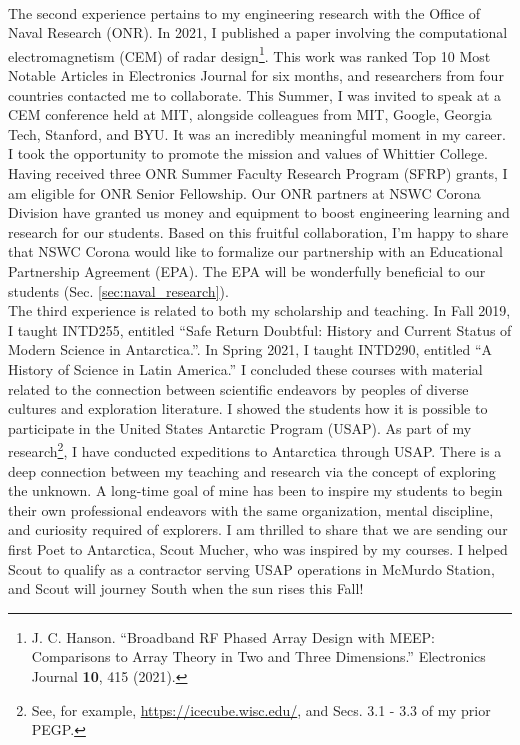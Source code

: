 \documentclass[../../main.tex]{subfiles}
\begin{document}
\\
\vspace{0.25cm}
The second experience pertains to my engineering research with the Office of Naval Research (ONR).  In 2021, I published a paper involving the computational electromagnetism (CEM) of radar design\footnote{J. C. Hanson.  ``Broadband RF Phased Array Design with MEEP: Comparisons to Array Theory in Two and Three Dimensions.'' Electronics Journal \textbf{10}, 415 (2021).}.  This work was ranked Top 10 Most Notable Articles in Electronics Journal for six months, and researchers from four countries contacted me to collaborate.  This Summer, I was invited to speak at a CEM conference held at MIT, alongside colleagues from MIT, Google, Georgia Tech, Stanford, and BYU.  It was an incredibly meaningful moment in my career.  I took the opportunity to promote the mission and values of Whittier College.  Having received three ONR Summer Faculty Research Program (SFRP) grants, I am eligible for ONR Senior Fellowship.  Our ONR partners at NSWC Corona Division have granted us money and equipment to boost engineering learning and research for our students.  Based on this fruitful collaboration, I'm happy to share that NSWC Corona would like to formalize our partnership with an Educational Partnership Agreement (EPA).  The EPA will be wonderfully beneficial to our students (Sec. \ref{sec:naval_research}).
\\
\vspace{0.25cm}
The third experience is related to both my scholarship and teaching.  In Fall 2019, I taught INTD255, entitled ``Safe Return Doubtful: History and Current Status of Modern Science in Antarctica.''.  In Spring 2021, I taught INTD290, entitled ``A History of Science in Latin America.''  I concluded these courses with material related to the connection between scientific endeavors by peoples of diverse cultures and exploration literature.  I showed the students how it is possible to participate in the United States Antarctic Program (USAP).  As part of my research\footnote{See, for example, \url{https://icecube.wisc.edu/}, and Secs. 3.1 - 3.3 of my prior PEGP.}, I have conducted expeditions to Antarctica through USAP.  There is a deep connection between my teaching and research via the concept of exploring the unknown.  A long-time goal of mine has been to inspire my students to begin their own professional endeavors with the same organization, mental discipline, and curiosity required of explorers.  I am thrilled to share that we are sending our first Poet to Antarctica, Scout Mucher, who was inspired by my courses.  I helped Scout to qualify as a contractor serving USAP operations in McMurdo Station, and Scout will journey South when the sun rises this Fall!
\end{document}
